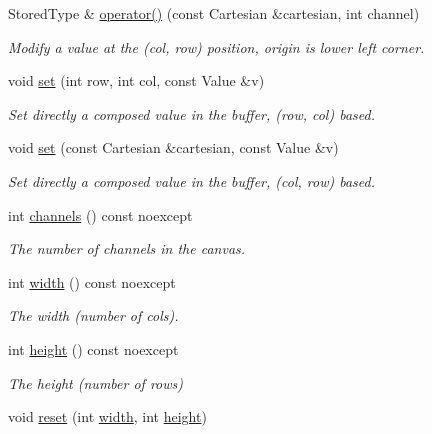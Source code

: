 \begin{DoxyCompactItemize}
Stored\+Type \& \mbox{\hyperlink{classomg_1_1_buffer_a8f688e810c931391612fd35a58b77306}{operator()}} (const Cartesian \&cartesian, int channel)
\begin{DoxyCompactList}\small\item\em Modify a value at the (col, row) position, origin is lower left corner. \end{DoxyCompactList}\item 
void \mbox{\hyperlink{classomg_1_1_buffer_a8b3d3ee363be87e1051a157a2f3abed6}{set}} (int row, int col, const Value \&v)
\begin{DoxyCompactList}\small\item\em Set directly a composed value in the buffer, (row, col) based. \end{DoxyCompactList}\item 
void \mbox{\hyperlink{classomg_1_1_buffer_a80204f5078fb0445eb21e586ec3644c3}{set}} (const Cartesian \&cartesian, const Value \&v)
\begin{DoxyCompactList}\small\item\em Set directly a composed value in the buffer, (col, row) based. \end{DoxyCompactList}\item 
int \mbox{\hyperlink{classomg_1_1_buffer_ab52287f39a698ecd026af1ca3e926f8c}{channels}} () const noexcept
\begin{DoxyCompactList}\small\item\em The number of channels in the canvas. \end{DoxyCompactList}\item 
int \mbox{\hyperlink{classomg_1_1_buffer_aa5b24d2a6fb4b994561d2558a640da65}{width}} () const noexcept
\begin{DoxyCompactList}\small\item\em The width (number of cols). \end{DoxyCompactList}\item 
int \mbox{\hyperlink{classomg_1_1_buffer_aa6be8a001e33259c8c5c3e3f20eedbc9}{height}} () const noexcept
\begin{DoxyCompactList}\small\item\em The height (number of rows) \end{DoxyCompactList}\item 
void \mbox{\hyperlink{classomg_1_1_buffer_a674041ad7b285bf2418b75b7653ded36}{reset}} (int \mbox{\hyperlink{classomg_1_1_buffer_aa5b24d2a6fb4b994561d2558a640da65}{width}}, int \mbox{\hyperlink{classomg_1_1_buffer_aa6be8a001e33259c8c5c3e3f20eedbc9}{height}})

\end{DoxyCompactItemize}
